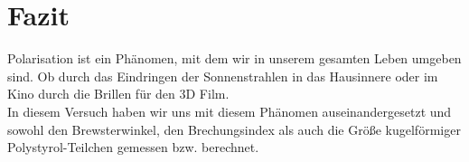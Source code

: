 

\chapter{Fazit}
\label{chap:fazit}


Polarisation ist ein Phänomen, mit dem wir in unserem gesamten Leben umgeben sind. Ob durch das Eindringen der Sonnenstrahlen in das Hausinnere oder im Kino durch die Brillen für den 3D Film. \\
In diesem Versuch haben wir uns mit diesem Phänomen auseinandergesetzt und sowohl den Brewsterwinkel, den Brechungsindex als auch die Größe kugelförmiger Polystyrol-Teilchen gemessen bzw. berechnet. 
